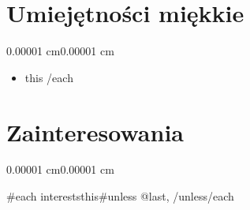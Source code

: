\documentclass[10pt, letterpaper]{article}
\newenvironment{highlights}{
    \begin{itemize}[
        topsep=0.10 cm,
        parsep=0.10 cm,
        partopsep=0pt,
        itemsep=0pt,
        leftmargin=10pt
    ]
}{
    \end{itemize}
}
\newenvironment{onecolentry}{
    \begin{adjustwidth}{0.00001 cm}{0.00001 cm}
}{
    \end{adjustwidth}
}
\begin{document}
\section{Umiejętności miękkie}

\begin{onecolentry}
    \begin{highlights}
        {{#each soft_skills}}
        \item {{this}}
        {{/each}}
    \end{highlights}
\end{onecolentry}

\section{Zainteresowania}

\begin{onecolentry}
    {{#each interests}}{{this}}{{#unless @last}}, {{/unless}}{{/each}}
\end{onecolentry}
\end{document}
